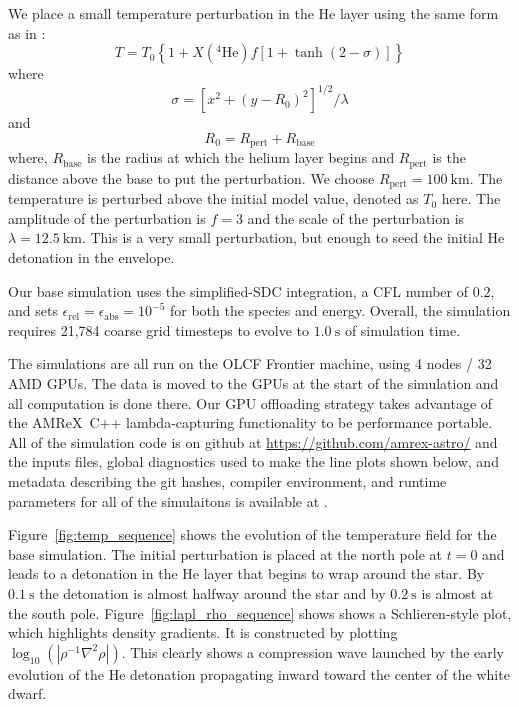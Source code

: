 \documentclass[modern]{aastex631}
\newcommand{\isotm}[2]{{}^{#2}\mathrm{#1}}
\newcommand{\amrex}{{\sf AMReX}}
\newcommand{\MarginPar}[1]{
    \marginpar{\vskip-\baselineskip%
               \raggedright%
               \tiny\sffamily%
               {\color{red}\hrule%
               \smallskip%
               #1\par%
               \smallskip%
               \hrule}}%
}
\begin{document}
We place a small temperature perturbation in the He layer using the
same form as in \citet{castro_simple_sdc}:
\begin{equation}
  T = T_0 \left \{ 1 + X(\isotm{He}{4}) f \left [1 + \tanh(2 - \sigma) \right ] \right \}
\end{equation}
where
\begin{equation}
  \sigma = \left [ x^2 + (y - R_0)^2 \right ]^{1/2} / \lambda
\end{equation}
and
\begin{equation}
  R_0 = R_\mathrm{pert} + R_\mathrm{base}
\end{equation}
where, $R_\mathrm{base}$ is the radius at which the helium layer
begins and $R_\mathrm{pert}$ is the distance above the base to put the
perturbation.  We choose $R_\mathrm{pert} = 100~\mathrm{km}$.  The
temperature is perturbed above the initial model value, denoted as
$T_0$ here.  The amplitude of the perturbation is $f = 3$ and the
scale of the perturbation is $\lambda = 12.5~\mathrm{km}$.  This is a
very small perturbation, but enough to seed the initial He detonation
in the envelope.  \MarginPar{give the peak temperature}

Our base simulation uses the simplified-SDC integration, a CFL number
of $0.2$, and sets $\epsilon_\mathrm{rel} = \epsilon_\mathrm{abs} =
10^{-5}$ for both the species and energy.  Overall, the simulation
requires 21,784 coarse grid timesteps to evolve to $1.0~\mathrm{s}$ of
simulation time.

The simulations are all run on the OLCF Frontier machine, using 4
nodes / 32 AMD GPUs.  The data is moved to the GPUs at the start of
the simulation and all computation is done there.  Our GPU offloading
strategy \citep{castro_gpu} takes advantage of the \amrex\ C++
lambda-capturing functionality to be performance portable.
All of the simulation code is on github at
\url{https://github.com/amrex-astro/} and the inputs files, global
diagnostics used to make the line plots shown below, and metadata
describing the git hashes, compiler environment, and runtime
parameters for all of the simulaitons is available at \MarginPar{add
  Zenodo ref}.

\begin{figure*}[t]
\centering
{}
\caption{\label{fig:temp_sequence} Time-sequence of the SDC run showing the temperature.}
\end{figure*}

Figure~\ref{fig:temp_sequence} shows the evolution of the temperature field for the base simulation.  The initial perturbation is placed at the north pole at $t=0$ and leads to a detonation in the He layer that begins to wrap around the star.  By $0.1~\mathrm{s}$ the detonation is almost halfway around the star and by $0.2~\mathrm{s}$ is almost at the south pole.  Figure~\ref{fig:lapl_rho_sequence} shows shows a Schlieren-style plot, which
highlights density gradients.  It is constructed by plotting
$\log_{10}(|\rho^{-1}\nabla^2\rho|)$.  This clearly shows a
compression wave launched by the early evolution of the He detonation propagating inward toward
the center of the white dwarf.  
\end{document}
